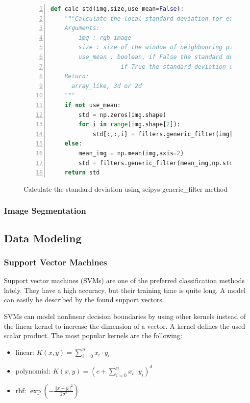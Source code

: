 \begin{figure}[H]


\begin{lstlisting}[language=Python,numbers=left]
def calc_std(img,size,use_mean=False):     
	"""Calculate the local standard deviation for each pixel of an image.
    Arguments:
        img : rgb image
        size : size of the window of neighbouring pixels
        use_mean : boolean, if False the standard deviation of R,G and B value are calculated and return as a 3 dimensional array.
                    if True the standard deviation of the mean is returned.
    Return:
      array_like, 3d or 2d
    """
    if not use_mean:
        std = np.zeros(img.shape)
        for i in range(img.shape[2]):
            std[:,:,i] = filters.generic_filter(img[:,:,i],np.std,size)
    else:
        mean_img = np.mean(img,axis=2)
        std = filters.generic_filter(mean_img,np.std,size)
    return std
\end{lstlisting}
\caption{Calculate the standard deviation using scipys generic\_filter method}
\label{calc_std}

\end{figure}



\subsubsection{Image Segmentation}


\subsection{Data Modeling}


\subsubsection{Support Vector Machines}

Support vector machines (SVMs) are one of the preferred classification
methods lately. They have a high accuracy, but their training time
is quite long. A model can easily be described by the found support
vectors.

SVMs can model nonlinear decision boundaries by using other kernels
instead of the linear kernel to increase the dimension of a vector.
A kernel defines the used scalar product. The most popular kernels
are the following:

\begin{itemize} 
\item linear:  $K(x,y) = \sum_{i=0}^n x_i\cdot y_i$ 
\item polynomial: $K(x,y) = (c+\sum_{i=0}^{n} x_i\cdot y_i)^d$	 	
\item rbf: $ \exp(-\frac{||x-y||^2}{2\sigma^2})$  
\end{itemize}  

